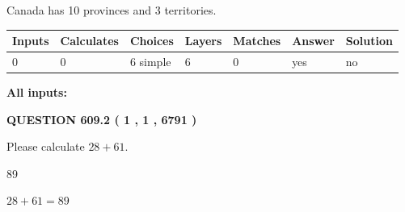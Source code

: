 \documentclass[12pt]{article}
\begin{document}
 
Canada has 10  provinces and 3 territories.
 
 
\noindent{}
 
 
   
   
   
   
\noindent\begin{tabular}{|l|l|l|l|l|l|l|}
 \hline
Inputs & Calculates & Choices & Layers & Matches & Answer & Solution \\ \hline
 0  & 
 0  & 
 6
  simple  
  & 
 6  & 
 0  & 
  yes & 
  no 
  \\ \hline
 \end{tabular}
   
   
   
   
\noindent{}
   
   
   
   
\noindent\vspace{0.1in}\hspace{-0.08in} {\textbf{\Large{All inputs: }}}
   
   
  
\vspace{0.2in}
  
{\textbf{\Large{QUESTION
609.2 
 ( 1 , 1 , 6791 )
}}}
  
  
 
Please calculate $ %
28 +  %
61 $.
 
 
 
\noindent{}
 
 

89
 
 
\noindent{}
 
 

 
 
 
\noindent{}
 
 

$ %
28 +  %
61=   %
89$
 
 
\noindent{}
 
 

 
   
\end{document}

